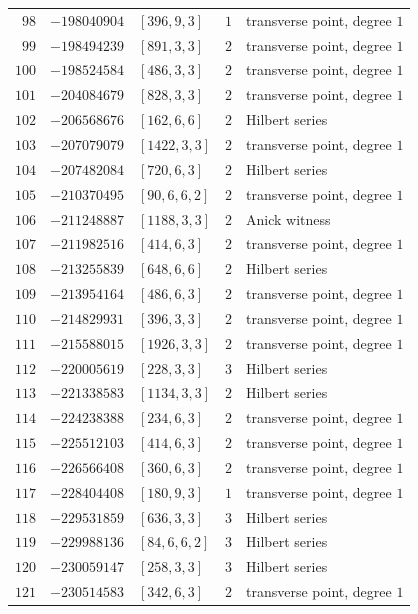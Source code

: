 \documentclass[11pt]{article}
\begin{document}
\begin{center}
\begin{longtable}{r r l c l}
$98$ & $-198040904$ & $[396,9,3]$ & $1$ & transverse point, degree $1$\\
$99$ & $-198494239$ & $[891,3,3]$ & $2$ & transverse point, degree $1$\\
$100$ & $-198524584$ & $[486,3,3]$ & $2$ & transverse point, degree $1$\\
$101$ & $-204084679$ & $[828,3,3]$ & $2$ & transverse point, degree $1$\\
$102$ & $-206568676$ & $[162,6,6]$ & $2$ & Hilbert series\\
$103$ & $-207079079$ & $[1422,3,3]$ & $2$ & transverse point, degree $1$\\
$104$ & $-207482084$ & $[720,6,3]$ & $2$ & Hilbert series\\
$105$ & $-210370495$ & $[90,6,6,2]$ & $2$ & transverse point, degree $1$\\
$106$ & $-211248887$ & $[1188,3,3]$ & $2$ & Anick witness\\
$107$ & $-211982516$ & $[414,6,3]$ & $2$ & transverse point, degree $1$\\
$108$ & $-213255839$ & $[648,6,6]$ & $2$ & Hilbert series\\
$109$ & $-213954164$ & $[486,6,3]$ & $2$ & transverse point, degree $1$\\
$110$ & $-214829931$ & $[396,3,3]$ & $2$ & transverse point, degree $1$\\
$111$ & $-215588015$ & $[1926,3,3]$ & $2$ & transverse point, degree $1$\\
$112$ & $-220005619$ & $[228,3,3]$ & $3$ & Hilbert series\\
$113$ & $-221338583$ & $[1134,3,3]$ & $2$ & Hilbert series\\
$114$ & $-224238388$ & $[234,6,3]$ & $2$ & transverse point, degree $1$\\
$115$ & $-225512103$ & $[414,6,3]$ & $2$ & transverse point, degree $1$\\
$116$ & $-226566408$ & $[360,6,3]$ & $2$ & transverse point, degree $1$\\
$117$ & $-228404408$ & $[180,9,3]$ & $1$ & transverse point, degree $1$\\
$118$ & $-229531859$ & $[636,3,3]$ & $3$ & Hilbert series\\
$119$ & $-229988136$ & $[84,6,6,2]$ & $3$ & Hilbert series\\
$120$ & $-230059147$ & $[258,3,3]$ & $3$ & Hilbert series\\
$121$ & $-230514583$ & $[342,6,3]$ & $2$ & transverse point, degree $1$\\

\end{longtable}
\end{center}
\end{document}
